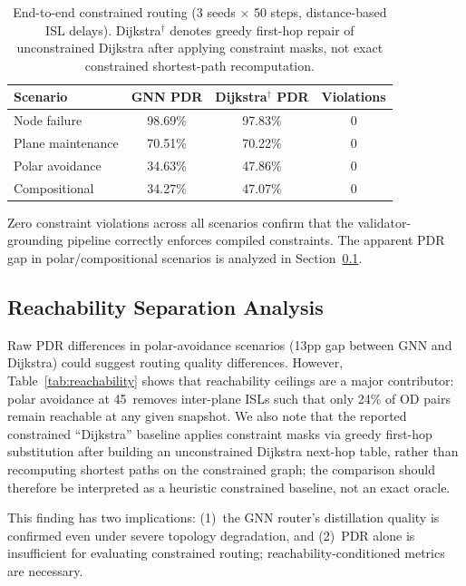 \documentclass[10pt, conference, letterpaper]{IEEEtran}
\begin{document}
\begin{table}[t]
\centering
\caption{End-to-end constrained routing (3 seeds $\times$ 50 steps,
distance-based ISL delays).
Dijkstra$^\dagger$ denotes greedy first-hop repair of unconstrained
Dijkstra after applying constraint masks, not exact constrained
shortest-path recomputation.}
\label{tab:e2e}
\begin{tabular}{lccc}
\toprule
\textbf{Scenario} & \textbf{GNN PDR} & \textbf{Dijkstra$^\dagger$ PDR} & \textbf{Violations} \\
\midrule
Node failure      & 98.69\% & 97.83\% & 0 \\
Plane maintenance & 70.51\% & 70.22\% & 0 \\
Polar avoidance   & 34.63\% & 47.86\% & 0 \\
Compositional     & 34.27\% & 47.07\% & 0 \\
\bottomrule
\end{tabular}
\end{table}

Zero constraint violations across all scenarios confirm that the
validator-grounding pipeline correctly enforces compiled constraints.
The apparent PDR gap in polar/compositional scenarios is analyzed
in Section~\ref{sec:reachability}.

\subsection{Reachability Separation Analysis}
\label{sec:reachability}

Raw PDR differences in polar-avoidance scenarios (13pp gap between
GNN and Dijkstra) could suggest routing quality differences. However,
Table~\ref{tab:reachability} shows that reachability ceilings are a major
contributor: polar avoidance at 45\textdegree\ removes inter-plane ISLs
such that only 24\% of OD pairs remain reachable at any given snapshot.
We also note that the reported constrained ``Dijkstra'' baseline applies
constraint masks via greedy first-hop substitution after building an
unconstrained Dijkstra next-hop table, rather than recomputing shortest
paths on the constrained graph; the comparison should therefore be
interpreted as a heuristic constrained baseline, not an exact oracle.

This finding has two implications: (1)~the GNN router's distillation
quality is confirmed even under severe topology degradation, and
(2)~PDR alone is insufficient for evaluating constrained routing;
reachability-conditioned metrics are necessary.
\end{document}
